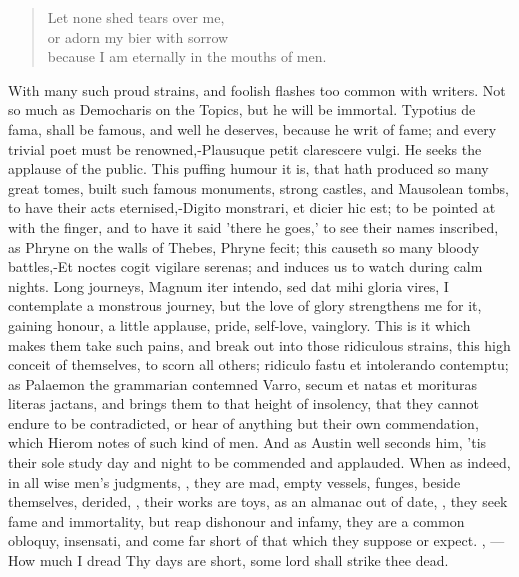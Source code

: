 {\settowidth{\versewidth}{Let none shed tears over me, or adorn my bier with sorrow}
\begin{verse}
Let none shed tears over me,\\
or adorn my bier with sorrow\\
because I am eternally in the mouths of men.
\end{verse}

With many such proud strains, and foolish flashes too common with writers. Not so much as Democharis on
the  Topics, but he will be immortal. Typotius de fama, shall be
famous, and well he deserves, because he writ of fame; and every
trivial poet must be renowned,-Plausuque petit clarescere vulgi. He
seeks the applause of the public. This puffing humour it is, that hath
produced so many great tomes, built such famous monuments, strong
castles, and Mausolean tombs, to have their acts eternised,-Digito
monstrari, et dicier hic est; to be pointed at with the finger, and to
have it said 'there he goes,' to see their names inscribed, as Phryne
on the walls of Thebes, Phryne fecit; this causeth so many bloody
battles,-Et noctes cogit vigilare serenas; and induces us to watch
during calm nights. Long journeys, Magnum iter intendo, sed dat mihi
gloria vires, I contemplate a monstrous journey, but the love of glory
strengthens me for it, gaining honour, a little applause, pride,
self-love, vainglory. This is it which makes them take such pains, and
break out into those ridiculous strains, this high conceit of
themselves, to scorn all others; ridiculo fastu et intolerando
contemptu; as Palaemon the grammarian contemned Varro, secum et
natas et morituras literas jactans, and brings them to that height of
insolency, that they cannot endure to be contradicted, or hear of
anything but their own commendation, which Hierom notes of such kind of
men. And as Austin well seconds him, 'tis their sole study day
and night to be commended and applauded. When as indeed, in all wise
men's judgments, , they are mad, empty vessels,
funges, beside themselves, derided, , their works are toys, as
an almanac out of date, , they
seek fame and immortality, but reap dishonour and infamy, they are a
common obloquy, insensati, and come far short of that which they
suppose or expect. ,
---How much I dread
Thy days are short, some lord shall strike thee dead.

}
